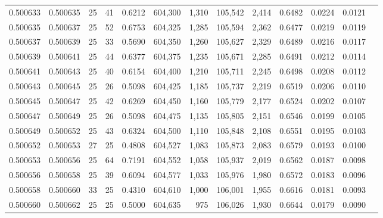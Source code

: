 \begin{tabular}{rrrrrrrrrrrrr}
0.500633 & 0.500635 &    25 &  41 &                                     0.6212 & 604,300 &   1,310 & 105,542 &   2,414 & 0.6482 & 0.0224 & 0.0121 \\
0.500635 & 0.500637 &    25 &  52 &                                     0.6753 & 604,325 &   1,285 & 105,594 &   2,362 & 0.6477 & 0.0219 & 0.0119 \\
0.500637 & 0.500639 &    25 &  33 &                                     0.5690 & 604,350 &   1,260 & 105,627 &   2,329 & 0.6489 & 0.0216 & 0.0117 \\
0.500639 & 0.500641 &    25 &  44 &                                     0.6377 & 604,375 &   1,235 & 105,671 &   2,285 & 0.6491 & 0.0212 & 0.0114 \\
0.500641 & 0.500643 &    25 &  40 &                                     0.6154 & 604,400 &   1,210 & 105,711 &   2,245 & 0.6498 & 0.0208 & 0.0112 \\
0.500643 & 0.500645 &    25 &  26 &                                     0.5098 & 604,425 &   1,185 & 105,737 &   2,219 & 0.6519 & 0.0206 & 0.0110 \\
0.500645 & 0.500647 &    25 &  42 &                                     0.6269 & 604,450 &   1,160 & 105,779 &   2,177 & 0.6524 & 0.0202 & 0.0107 \\
0.500647 & 0.500649 &    25 &  26 &                                     0.5098 & 604,475 &   1,135 & 105,805 &   2,151 & 0.6546 & 0.0199 & 0.0105 \\
0.500649 & 0.500652 &    25 &  43 &                                     0.6324 & 604,500 &   1,110 & 105,848 &   2,108 & 0.6551 & 0.0195 & 0.0103 \\
0.500652 & 0.500653 &    27 &  25 &                                     0.4808 & 604,527 &   1,083 & 105,873 &   2,083 & 0.6579 & 0.0193 & 0.0100 \\
0.500653 & 0.500656 &    25 &  64 &                                     0.7191 & 604,552 &   1,058 & 105,937 &   2,019 & 0.6562 & 0.0187 & 0.0098 \\
0.500656 & 0.500658 &    25 &  39 &                                     0.6094 & 604,577 &   1,033 & 105,976 &   1,980 & 0.6572 & 0.0183 & 0.0096 \\
0.500658 & 0.500660 &    33 &  25 &                                     0.4310 & 604,610 &   1,000 & 106,001 &   1,955 & 0.6616 & 0.0181 & 0.0093 \\
0.500660 & 0.500662 &    25 &  25 &                                     0.5000 & 604,635 &     975 & 106,026 &   1,930 & 0.6644 & 0.0179 & 0.0090 \\

\end{tabular}
